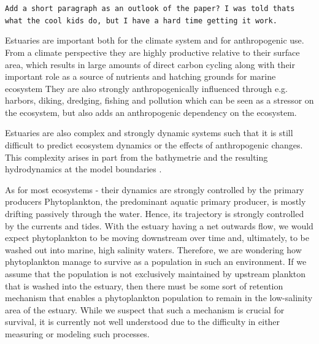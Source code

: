 \documentclass[npg, manuscript]{copernicus}
\begin{document}


\introduction  %
\texttt{Add a short paragraph as an outlook of the paper? I was told thats what the cool kids do, but I have a hard time getting it work.}


Estuaries are important both for the climate system and for anthropogenic use.
From a climate perspective they are highly productive relative to their surface area,
which results in large amounts of direct carbon cycling 
along with their important role as a source of nutrients and hatching grounds for marine ecosystem 
\citep{Cloern2014,Arevalo2023}
They are also strongly anthropogenically influenced through e.g. harbors, diking, dredging, fishing and pollution which can be seen as a stressor on the ecosystem, but also adds an anthropogenic dependency on the ecosystem. 
\citep{Jennerjahn2013, Brown2022, Wilson2002}

Estuaries are also complex and strongly dynamic systems such that it is still difficult to predict ecosystem dynamics or the effects of anthropogenic changes.
This complexity arises in part from the bathymetrie and the resulting hydrodynamics at the model boundaries \citep{Michael2016, Fringer2019}. 

As for most ecosystems - their dynamics are strongly controlled by the primary producers \citep{Chen2023}
Phytoplankton, the 	predominant aquatic primary producer, is mostly drifting passively through the water.
Hence, its trajectory is strongly controlled by the currents and tides.
With the estuary having a net outwards flow, we would expect phytoplankton to be moving
 downstream over time and, ultimately, to be washed out into marine, high salinity waters.
Therefore, we are wondering how phytoplankton manage to survive as a population in such an environment.
If we assume that the population is not exclusively maintained by upstream plankton that is washed into the estuary,
 then there must be some sort of retention mechanism that enables a phytoplankton population to remain in the low-salinity area of the estuary.
While we suspect that such a mechanism is crucial for survival, it is currently not well understood 
due to the difficulty in either measuring or modeling such processes.
\end{document}
